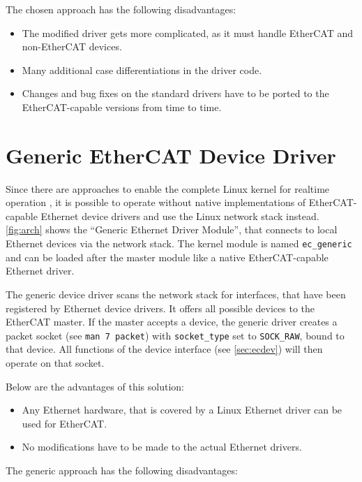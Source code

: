 \documentclass[a4paper,12pt,BCOR6mm,bibtotoc,idxtotoc]{scrbook}
\begin{document}
The chosen approach has the following disadvantages:

\begin{itemize}
\item The modified driver gets more complicated, as it must handle
  EtherCAT and non-EtherCAT devices.
\item Many additional case differentiations in the driver code.
\item Changes and bug fixes on the standard drivers have to be ported
  to the Ether\-CAT-capable versions from time to time.
\end{itemize}


\section{Generic EtherCAT Device Driver}
\label{sec:generic-driver}

Since there are approaches to enable the complete Linux kernel for realtime
operation \cite{rt-preempt}, it is possible to operate without native
implementations of EtherCAT-capable Ethernet device drivers and use the Linux
network stack instead. \autoref{fig:arch} shows the ``Generic Ethernet Driver
Module'', that connects to local Ethernet devices via the network stack. The
kernel module is named \lstinline+ec_generic+ and can be loaded after the
master module like a native EtherCAT-capable Ethernet driver.

The generic device driver scans the network stack for interfaces, that have
been registered by Ethernet device drivers. It offers all possible devices to
the EtherCAT master. If the master accepts a device, the generic driver
creates a packet socket (see \lstinline+man 7 packet+) with
\lstinline+socket_type+ set to \lstinline+SOCK_RAW+, bound to that device. All
functions of the device interface (see \autoref{sec:ecdev}) will then operate
on that socket.

Below are the advantages of this solution:

\begin{itemize}
\item Any Ethernet hardware, that is covered by a Linux Ethernet driver can be
used for EtherCAT.
\item No modifications have to be made to the actual Ethernet drivers.
\end{itemize}

The generic approach has the following disadvantages:
\end{document}
